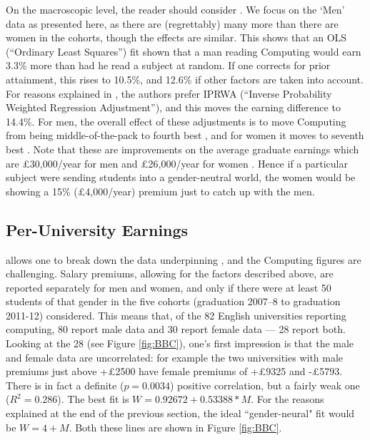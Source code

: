 \documentclass[sigconf,anonymous]{acmart}
\begin{document}
On the macroscopic level, the reader should consider \cite[Table
5]{DfE2018d}. We focus on the `Men' data as presented here, as there
are (regrettably) many more than there are women in the cohorts,
though the effects are similar. This shows that an OLS (``Ordinary
Least Squares'') fit shown that a man reading Computing would earn
3.3\% more than had he read a subject at random. If one corrects for
prior attainment, this rises to 10.5\%, and 12.6\% if other factors
are taken into account. For reasons explained in
\cite[\S4.2]{DfE2018d}, the authors prefer IPRWA (``Inverse
Probability Weighted Regression Adjustment''), and this moves the
earning difference to 14.4\%. For men, the overall effect of these
adjustments is to move Computing from being middle-of-the-pack
\cite[Figure 15]{DfE2018d} to fourth best \cite[Figure 17]{DfE2018d},
and for women it moves to seventh best \cite[Figure
16]{DfE2018d}. Note that these are improvements on the average
graduate earnings which are \pounds30,000/year for men and
\pounds26,000/year for women \cite[p. 37]{DfE2018d}. Hence if a
particular subject were sending students into a gender-neutral world,
the women would be showing a 15\% (\pounds4,000/year) premium just to
catch up with the men.

\subsection{Per-University Earnings}

\cite{BBC2018f} allows one to break down the data underpinning
\cite{DfE2018d}, and the Computing figures are challenging.  Salary
premiums, allowing for the factors described above, are reported
separately for men and women, and only if there were at least 50
students of that gender in the five cohorts (graduation 2007--8 to
graduation 2011-12) considered. This means that, of the 82 English
universities reporting computing, 80 report male data and 30 report
female data --- 28 report both. Looking at the 28 (see Figure
\ref{fig:BBC}), one's first impression is that the male and female
data are uncorrelated: for example the two universities with male
premiums just above +\pounds2500 have female premiums of +\pounds9325
and -\pounds5793. There is in fact a definite ($p=0.0034$) positive
correlation, but a fairly weak one ($R^2=0.286$). The best fit is
$W=0.92672+0.53388*M$. For the reasons explained at the end of the
previous section, the ideal ``gender-neural" fit would be
$W=4+M$. Both these lines are shown in Figure \ref{fig:BBC}.
\end{document}
